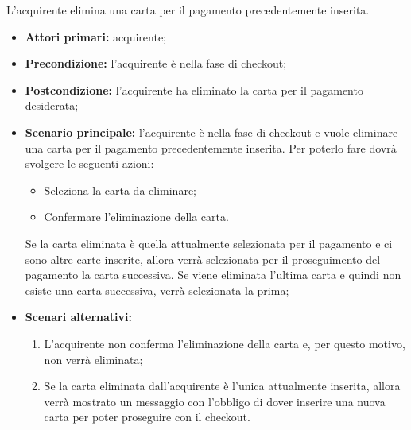 
L'acquirente elimina una carta per il pagamento precedentemente inserita.
\begin{itemize}
    \item \textbf{Attori primari:} acquirente;
    \item \textbf{Precondizione:} l'acquirente è nella fase di checkout;
    \item \textbf{Postcondizione:} l'acquirente ha eliminato la carta per il pagamento desiderata;
    \item \textbf{Scenario principale:} l'acquirente è nella fase di checkout e vuole eliminare una carta per il pagamento precedentemente inserita. Per poterlo fare dovrà svolgere le seguenti azioni:
    \begin{itemize}
        \item Seleziona la carta da eliminare;
        \item Confermare l'eliminazione della carta.
    \end{itemize}
    Se la carta eliminata è quella attualmente selezionata per il pagamento e ci sono altre carte inserite, allora verrà selezionata per il proseguimento del pagamento la carta successiva. Se viene eliminata l'ultima carta e quindi non esiste una carta successiva, verrà selezionata la prima;
    \item \textbf{Scenari alternativi:}
    \begin{enumerate}[label=\lett]
        \item L'acquirente non conferma l'eliminazione della carta e, per questo motivo, non verrà eliminata;
        \item Se la carta eliminata dall'acquirente è l'unica attualmente inserita, allora verrà mostrato un messaggio con l'obbligo di dover inserire una nuova carta per poter proseguire con il checkout.
    \end{enumerate}
\end{itemize}

